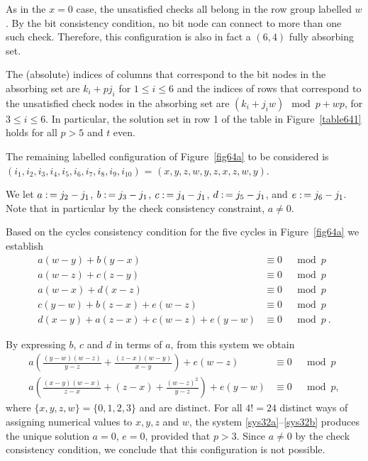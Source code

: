 As in the $x=0$ case, the unsatisfied checks all belong in the row
group labelled $w$. By the bit consistency condition, no bit node
can connect to more than one such check. Therefore, this
configuration is also in fact a $(6,4)$ fully absorbing set.

The (absolute) indices of columns that correspond to the bit nodes
in the absorbing set are $k_i+pj_i$ for $1 \leq i \leq 6$ and the
indices of rows that correspond to the unsatisfied check nodes in
the absorbing set are $(k_i+j_iw) \mod p+ wp$, for $3\leq i \leq 6$.
In particular, the solution set in row 1 of the table in
Figure~\ref{table641} holds for all $p
> 5$ and $t$ even.


 The remaining labelled configuration of Figure~\ref{fig64a} to be considered is
\newline \noindent$(i_1,i_2,i_3,i_4,i_5,i_6,i_7,i_8,i_9,i_{10})$ =
$(x,y,z,w,y,z,x,z,w,y)$.

We let $a \asn j_2-j_1$, $b \asn j_3-j_1$, $c \asn j_4-j_1$,
 $d \asn j_5-j_1$, and $e \asn j_6-j_1$.  Note that in particular
 by the check consistency constraint, $a \neq 0$.

Based on the cycles consistency condition for the five cycles in
Figure~\ref{fig64a} we establish
 \begin{equation}\label{sys31}\begin{array}{cccc}
 a(w-y)+b(y-x) &\equiv 0 &\mod p\\
 a(w-z)+c(z-y) &\equiv 0 &\mod p\\
 a(w-x)+d(x-z) &\equiv 0 &\mod p\\
 c(y-w)+b(z-x)+e(w-z) &\equiv 0 &\mod p\\
 d(x-y)+a(z-x)+c(w-z)+e(y-w)&\equiv 0 &\mod p~.
 \end{array}
 \end{equation}



By expressing $b$, $c$ and $d$ in terms of $a$, from this system
we obtain
\begin{eqnarray}\label{sys32a}
a\left(\frac{(y-w)(w-z)}{y-z}+\frac{(z-x)(w-y)}{x-y} \right)+e(w-z) &\equiv 0 &\mod p\\
\label{sys32b}a\left(\frac{(x-y)(w-x)}{z-x}+(z-x)+\frac{(w-z)^2}{y-z}
\right)+e(y-w)&\equiv 0 &\mod p,
\end{eqnarray}
where $\{x,y,z,w\} =\{0,1,2,3\}$ and are distinct. For all $4!=24$
distinct ways of assigning numerical values to $x,y,z$ and $w$, the
system \eqref{sys32a}--\eqref{sys32b} produces the unique solution
$a=0$, $e=0$, provided that $p>3$. Since $a\neq 0$ by the check
consistency condition, we conclude that this configuration is not
possible.

